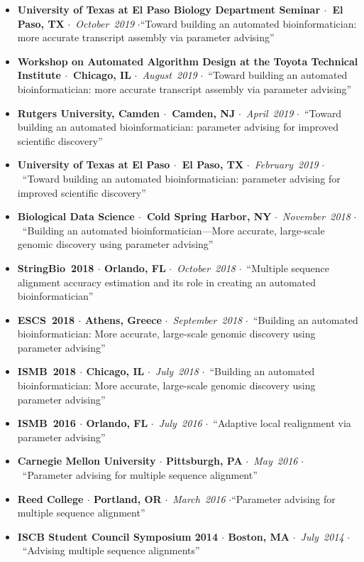\documentclass[10pt,letterpaper]{article}
\newcommand{\bigdot}{$\cdot$\xspace}
\begin{document}
\begin{itemize}[leftmargin=*,labelindent=5pt,itemindent=-15pt]
  \item \textbf{University of Texas at El Paso Biology Department Seminar \bigdot~El Paso, TX} \bigdot~\textit{October~2019} \bigdot ``Toward building an automated bioinformatician: more accurate transcript assembly via parameter advising''
  \item \textbf{Workshop on Automated Algorithm Design at the Toyota Technical Institute \bigdot~Chicago, IL} \bigdot~\textit{August~2019} \bigdot~``Toward building an automated bioinformatician: more accurate transcript assembly via parameter advising''
  \item \textbf{Rutgers University, Camden \bigdot~Camden, NJ} \bigdot~\textit{April~2019} \bigdot~``Toward building an automated bioinformatician: 
parameter advising for improved scientific discovery''
  \item \textbf{University of Texas at El Paso \bigdot~El Paso, TX} \bigdot~\textit{February~2019} \bigdot~``Toward building an automated bioinformatician: 
parameter advising for improved scientific discovery''
  \item \textbf{Biological Data Science \bigdot~Cold Spring Harbor, NY} \bigdot~\textit{November~2018} \bigdot~``Building an automated bioinformatician---More accurate, large-scale genomic discovery using parameter advising'' 
   \item \textbf{StringBio~2018 \bigdot Orlando, FL} \bigdot~\textit{October~2018} \bigdot~``Multiple sequence alignment accuracy estimation and its role in creating an automated bioinformatician'' 
   \item \textbf{ESCS~2018 \bigdot Athens, Greece} \bigdot~\textit{September~2018} \bigdot~``Building an automated bioinformatician: More accurate, large-scale genomic discovery using parameter advising''
    \item \textbf{ISMB~2018 \bigdot Chicago, IL} \bigdot~\textit{July~2018} \bigdot~``Building an automated bioinformatician: More accurate, large-scale genomic discovery using parameter advising''
    \item \textbf{ISMB~2016 \bigdot Orlando, FL} \bigdot~\textit{July~2016} \bigdot~``Adaptive local realignment via parameter advising'' 
    \item \textbf{Carnegie Mellon University \bigdot Pittsburgh, PA} \bigdot~\textit{May~2016} \bigdot~``Parameter advising for multiple sequence alignment''
    \item \textbf{Reed College \bigdot Portland, OR} \bigdot~\textit{March~2016} \bigdot ``Parameter advising for multiple sequence alignment''
    \item \textbf{ISCB Student Council Symposium 2014 \bigdot  Boston, MA} \bigdot~\textit{July~2014} \bigdot~``Advising multiple sequence alignments''
   
\end{itemize}
\end{document}
